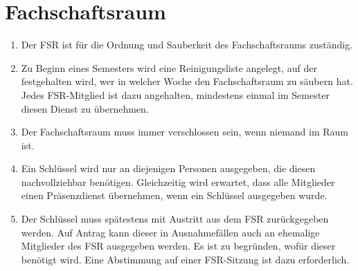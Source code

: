 \section{Fachschaftsraum}
\begin{enumerate}
	\item Der FSR ist für die Ordnung und Sauberkeit des Fachschaftsraums zuständig.
	\item Zu Beginn eines Semesters wird eine Reinigungsliste angelegt, auf der festgehalten wird, wer in welcher Woche den Fachschaftsraum zu säubern hat.
	Jedes FSR-Mitglied ist dazu angehalten, mindestens einmal im Semester diesen Dienst zu übernehmen.
	\item Der Fachschaftsraum muss immer verschlossen sein, wenn niemand im Raum ist.
	\item Ein Schlüssel wird nur an diejenigen Personen ausgegeben, die diesen nachvollziehbar benötigen.
	Gleichzeitig wird erwartet, dass alle Mitglieder einen Präsenzdienst übernehmen, wenn ein Schlüssel ausgegeben wurde.
	\item Der Schlüssel muss spätestens mit Austritt aus dem FSR zurückgegeben werden.
	Auf Antrag kann dieser in Ausnahmefällen auch an ehemalige Mitglieder des FSR ausgegeben werden.
	Es ist zu begründen, wofür dieser benötigt wird.
	Eine Abstimmung auf einer FSR-Sitzung ist dazu erforderlich.
\end{enumerate}


